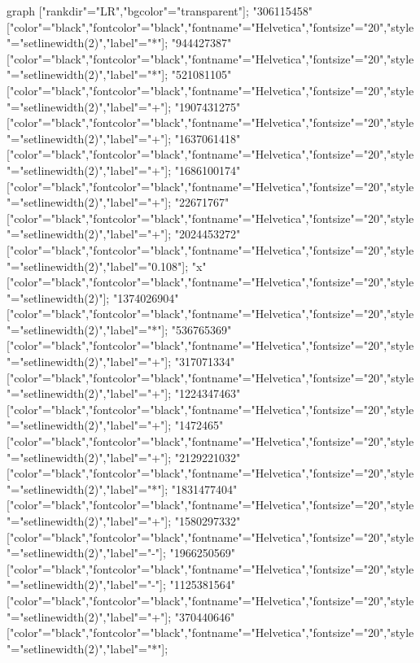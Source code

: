  {
    graph ["rankdir"="LR","bgcolor"="transparent"];
    "306115458" ["color"="black","fontcolor"="black","fontname"="Helvetica","fontsize"="20","style"="setlinewidth(2)","label"="*"];
    "944427387" ["color"="black","fontcolor"="black","fontname"="Helvetica","fontsize"="20","style"="setlinewidth(2)","label"="*"];
    "521081105" ["color"="black","fontcolor"="black","fontname"="Helvetica","fontsize"="20","style"="setlinewidth(2)","label"="+"];
    "1907431275" ["color"="black","fontcolor"="black","fontname"="Helvetica","fontsize"="20","style"="setlinewidth(2)","label"="+"];
    "1637061418" ["color"="black","fontcolor"="black","fontname"="Helvetica","fontsize"="20","style"="setlinewidth(2)","label"="+"];
    "1686100174" ["color"="black","fontcolor"="black","fontname"="Helvetica","fontsize"="20","style"="setlinewidth(2)","label"="+"];
    "22671767" ["color"="black","fontcolor"="black","fontname"="Helvetica","fontsize"="20","style"="setlinewidth(2)","label"="+"];
    "2024453272" ["color"="black","fontcolor"="black","fontname"="Helvetica","fontsize"="20","style"="setlinewidth(2)","label"="0.108"];
    "x" ["color"="black","fontcolor"="black","fontname"="Helvetica","fontsize"="20","style"="setlinewidth(2)"];
    "1374026904" ["color"="black","fontcolor"="black","fontname"="Helvetica","fontsize"="20","style"="setlinewidth(2)","label"="*"];
    "536765369" ["color"="black","fontcolor"="black","fontname"="Helvetica","fontsize"="20","style"="setlinewidth(2)","label"="+"];
    "317071334" ["color"="black","fontcolor"="black","fontname"="Helvetica","fontsize"="20","style"="setlinewidth(2)","label"="+"];
    "1224347463" ["color"="black","fontcolor"="black","fontname"="Helvetica","fontsize"="20","style"="setlinewidth(2)","label"="+"];
    "1472465" ["color"="black","fontcolor"="black","fontname"="Helvetica","fontsize"="20","style"="setlinewidth(2)","label"="+"];
    "2129221032" ["color"="black","fontcolor"="black","fontname"="Helvetica","fontsize"="20","style"="setlinewidth(2)","label"="*"];
    "1831477404" ["color"="black","fontcolor"="black","fontname"="Helvetica","fontsize"="20","style"="setlinewidth(2)","label"="+"];
    "1580297332" ["color"="black","fontcolor"="black","fontname"="Helvetica","fontsize"="20","style"="setlinewidth(2)","label"="-"];
    "1966250569" ["color"="black","fontcolor"="black","fontname"="Helvetica","fontsize"="20","style"="setlinewidth(2)","label"="-"];
    "1125381564" ["color"="black","fontcolor"="black","fontname"="Helvetica","fontsize"="20","style"="setlinewidth(2)","label"="+"];
    "370440646" ["color"="black","fontcolor"="black","fontname"="Helvetica","fontsize"="20","style"="setlinewidth(2)","label"="*"];
}
